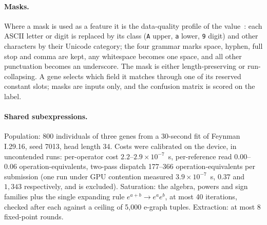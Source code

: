 \documentclass[sigconf,nonacm]{acmart}
\begin{document}
\paragraph{Masks.} Where a mask is used as a feature it is the data-quality
profile of the value~\cite{morgan2017bytefreq,morgan2017spark}: each ASCII
letter or digit is replaced by its class (\texttt{A} upper, \texttt{a} lower,
\texttt{9} digit) and other characters by their Unicode category; the four
grammar marks space, hyphen, full stop and comma are kept, any whitespace
becomes one space, and all other punctuation becomes an underscore. The mask is
either length-preserving or run-collapsing. A gene selects which field it matches through one of its
reserved constant slots; masks are inputs only, and the confusion matrix is
scored on the label.

\paragraph{Shared subexpressions.} Population: 800 individuals of three genes
from a 30-second fit of Feynman I.29.16, seed 7013, head length 34. Costs were
calibrated on the device, in uncontended runs: per-operator cost
$2.2$--$2.9\times10^{-7}$~s, per-reference read $0.00$--$0.06$
operation-equivalents, two-pass dispatch 177--366 operation-equivalents per
submission (one run under GPU contention measured $3.9\times10^{-7}$~s,
$0.37$ and $1{,}343$ respectively, and is excluded). Saturation: the algebra, powers
and sign families plus the single expanding rule $e^{a+b}\to e^{a}e^{b}$, at
most 40 iterations, checked after each against a ceiling of 5{,}000 e-graph
tuples. Extraction: at most 8 fixed-point rounds.
\end{document}
